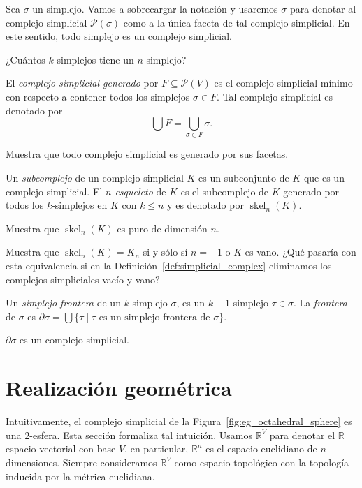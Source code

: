 \documentclass{standalone}
\begin{document}
	Sea $\sigma$ un simplejo. Vamos a sobrecargar la notación y usaremos $\sigma$ para denotar al complejo simplicial $\mathcal{P}(\sigma)$ como a la única faceta de tal complejo simplicial. En este sentido, todo simplejo es un complejo simplicial.
	
	\begin{exercise}
		¿Cuántos $k$-simplejos tiene un $n$-simplejo?
	\end{exercise}
	
	El \emph{complejo simplicial generado} por $F\subseteq\mathcal{P}(V)$ es el complejo simplicial mínimo con respecto a contener todos los simplejos $\sigma\in F$. Tal complejo simplicial es denotado por 
	\[
	\bigcup F=\bigcup_{\sigma\in F}\sigma.
	\]
	
	\begin{exercise}
		Muestra que todo complejo simplicial es generado por sus facetas.
	\end{exercise}
	
	Un \emph{subcomplejo} de un complejo simplicial $K$ es un subconjunto de $K$ que es un complejo simplicial. El \emph{$n$-esqueleto} de $K$ es el subcomplejo de $K$ generado por todos los $k$-simplejos en $K$ con $k\leq n$ y es denotado por $\operatorname{skel}_{n}(K)$.
	
	\begin{exercise}
		Muestra que $\operatorname{skel}_{n}(K)$ es puro de dimensión $n$.
	\end{exercise}
	
	\begin{exercise}
		Muestra que $\operatorname{skel}_{n}(K)=K_{n}$ si y sólo sí $n=-1$ o $K$ es vano. ¿Qué pasaría con esta equivalencia si en la Definición~\ref{def:simplicial_complex} eliminamos los complejos simpliciales vacío y vano?
	\end{exercise}	
	
	Un \emph{simplejo frontera} de un $k$-simplejo $\sigma$, es un $k-1$-simplejo $\tau\in\sigma$. La \emph{frontera} de $\sigma$ es $\partial\sigma=\bigcup\{\tau\mid\tau\text{ es un simplejo frontera de }\sigma\}$.
	
	\begin{exercise}
		$\partial\sigma$ es un complejo simplicial.
	\end{exercise}
	
	\section{Realización geométrica}
	\noindent Intuitivamente, el complejo simplicial de la Figura~\ref{fig:eg_octahedral_sphere} es una $2$-esfera. Esta sección formaliza tal intuición. Usamos $\mathbb{R}^{V}$ para denotar el $\mathbb{R}$ espacio vectorial con base $V$, en particular, $\mathbb{R}^{n}$ es el espacio euclidiano de $n$ dimensiones. Siempre consideramos $\mathbb{R}^{V}$ como espacio topológico con la topología inducida por la métrica euclidiana.
	
\end{document}
